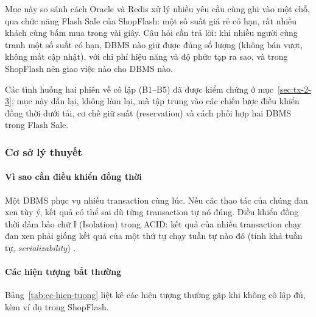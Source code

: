 
Mục này so sánh cách Oracle và Redis xử lý nhiều yêu cầu cùng ghi vào một chỗ, qua chức năng Flash Sale của ShopFlash: một số suất giá rẻ có hạn, rất nhiều khách cùng bấm mua trong vài giây. Câu hỏi cần trả lời: khi nhiều người cùng tranh một số suất có hạn, DBMS nào giữ được đúng số lượng (không bán vượt, không mất cập nhật), với chi phí hiệu năng và độ phức tạp ra sao, và trong ShopFlash nên giao việc nào cho DBMS nào.

Các tình huống hai phiên về cô lập (B1--B5) đã được kiểm chứng ở mục~\ref{sec:tx-2-3}; mục này dẫn lại, không làm lại, mà tập trung vào các chiến lược điều khiển đồng thời dưới tải, cơ chế giữ suất (reservation) và cách phối hợp hai DBMS trong Flash Sale.

\subsubsection{Cơ sở lý thuyết}\label{sec:cc-ly-thuyet}

\paragraph{Vì sao cần điều khiển đồng thời}
Một DBMS phục vụ nhiều transaction cùng lúc. Nếu các thao tác của chúng đan xen tùy ý, kết quả có thể sai dù từng transaction tự nó đúng. Điều khiển đồng thời đảm bảo chữ I (Isolation) trong ACID: kết quả của nhiều transaction chạy đan xen phải giống kết quả của một thứ tự chạy tuần tự nào đó (tính khả tuần tự, \emph{serializability}) \cite{cc-silberschatz2019}.

\paragraph{Các hiện tượng bất thường}
Bảng~\ref{tab:cc-hien-tuong} liệt kê các hiện tượng thường gặp khi không cô lập đủ, kèm ví dụ trong ShopFlash.

